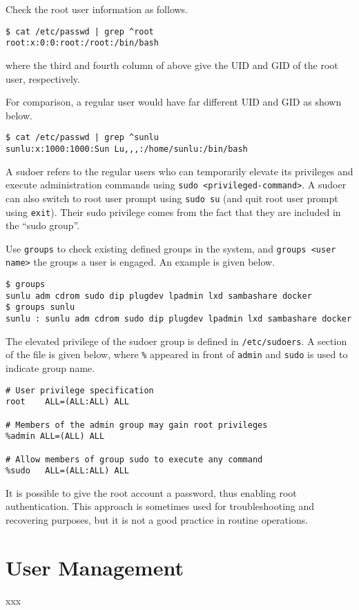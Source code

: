 Check the root user information as follows.
\begin{lstlisting}
$ cat /etc/passwd | grep ^root
root:x:0:0:root:/root:/bin/bash
\end{lstlisting}
where the third and fourth column of above give the UID and GID of the root user, respectively.

For comparison, a regular user would have far different UID and GID as shown below.
\begin{lstlisting}
$ cat /etc/passwd | grep ^sunlu
sunlu:x:1000:1000:Sun Lu,,,:/home/sunlu:/bin/bash
\end{lstlisting}

A sudoer refers to the regular users who can temporarily elevate its privileges and execute administration commands using \verb|sudo <privileged-command>|. A sudoer can also switch to root user prompt using \verb|sudo su| (and quit root user prompt using \verb|exit|). Their sudo privilege comes from the fact that they are included in the ``sudo group''.

Use \verb|groups| to check existing defined groups in the system, and \verb|groups <user name>| the groups a user is engaged. An example is given below.
\begin{lstlisting}
$ groups
sunlu adm cdrom sudo dip plugdev lpadmin lxd sambashare docker
$ groups sunlu
sunlu : sunlu adm cdrom sudo dip plugdev lpadmin lxd sambashare docker
\end{lstlisting}

The elevated privilege of the sudoer group is defined in \verb|/etc/sudoers|. A section of the file is given below, where \verb|%| appeared in front of \verb|admin| and \verb|sudo| is used to indicate group name.
\begin{lstlisting}
# User privilege specification
root	ALL=(ALL:ALL) ALL

# Members of the admin group may gain root privileges
%admin ALL=(ALL) ALL

# Allow members of group sudo to execute any command
%sudo	ALL=(ALL:ALL) ALL
\end{lstlisting}

It is possible to give the root account a password, thus enabling root authentication. This approach is sometimes used for troubleshooting and recovering purposes, but it is not a good practice in routine operations.

\section{User Management}

xxx


















